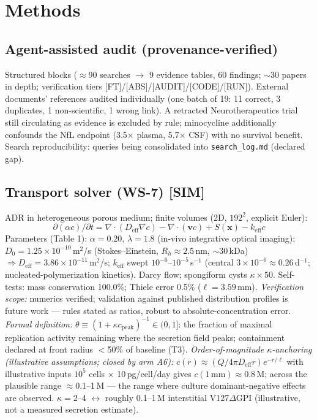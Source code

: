 \documentclass[10pt,twocolumn]{article}
\begin{document}
\section{Methods}
\subsection{Agent-assisted audit (provenance-verified)}
Structured blocks ($\approx$90 searches $\to$ 9 evidence tables, 60 findings; $\sim$30 papers in depth; verification tiers [FT]/[ABS]/[AUDIT]/[CODE]/[RUN]). External documents' references audited individually (one batch of 19: 11 correct, 3 duplicates, 1 non-scientific, 1 wrong link). A retracted Neurotherapeutics trial still circulating as evidence is excluded by rule; minocycline additionally confounds the NfL endpoint (3.5$\times$ plasma, 5.7$\times$ CSF) with no survival benefit. Search reproducibility: queries being consolidated into \texttt{search\_log.md} (declared gap).

\subsection{Transport solver (WS-7) [SIM]}
ADR in heterogeneous porous medium; finite volumes (2D, $192^2$, explicit Euler):
\begin{equation}\partial(\alpha c)/\partial t=\nabla\!\cdot\!(D_{\text{eff}}\nabla c)-\nabla\!\cdot\!(\mathbf{v}c)+S(\mathbf{x})-k_{\text{eff}}c\end{equation}
Parameters (Table 1): $\alpha{=}0.20$, $\lambda{=}1.8$ (in-vivo integrative optical imaging); $D_0{=}1.25{\times}10^{-10}$\,m$^2$/s (Stokes--Einstein, $R_h{\approx}2.5$\,nm, $\sim$30\,kDa) $\Rightarrow D_{\text{eff}}{=}3.86{\times}10^{-11}$\,m$^2$/s; $k_{\text{eff}}$ swept $10^{-6}$--$10^{-5}$\,s$^{-1}$ (central $3{\times}10^{-6}\approx0.26$\,d$^{-1}$; nucleated-polymerization kinetics). Darcy flow; spongiform cysts $\kappa\times50$. Self-tests: mass conservation 100.0\%; Thiele error 0.5\% ($\ell{=}3.59$\,mm). \emph{Verification scope:} numerics verified; validation against published distribution profiles is future work --- rules stated as ratios, robust to absolute-concentration error. \emph{Formal definition:} $\theta\equiv(1+\kappa c_{\text{peak}})^{-1}\in(0,1]$: the fraction of maximal replication activity remaining where the secretion field peaks; containment declared at front radius $<$50\% of baseline (T3). \emph{Order-of-magnitude $\kappa$-anchoring (illustrative assumptions; closed by arm A6):} $c(r)\approx(Q/4\pi D_{\text{eff}}r)e^{-r/\ell}$ with illustrative inputs $10^5$ cells $\times$ 10\,pg/cell/day gives $c(1\,\text{mm})\approx0.8$\,\textmu M; across the plausible range $\approx$0.1--1\,\textmu M --- the range where culture dominant-negative effects are observed. $\kappa{=}2$--4 $\leftrightarrow$ roughly 0.1--1\,\textmu M interstitial V127$\Delta$GPI (illustrative, not a measured secretion estimate).
\end{document}
